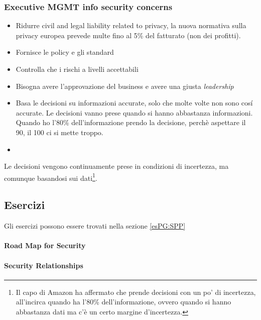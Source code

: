 \subsubsection{Executive MGMT info security concerns}

\begin{itemize}
\item Ridurre civil and legal liability related to privacy, la nuova normativa 
sulla privacy europea prevede multe fino al 5\% del fatturato (non dei 
profitti).
\item Fornisce le policy e gli standard
\item Controlla che i rischi a livelli accettabili
\item Bisogna avere l'approvazione del business e avere una giusta 
\textit{leadership}
\item Basa le decisioni su informazioni accurate, solo che molte volte non sono 
cosí accurate. Le decisioni vanno prese quando si hanno abbastanza informazioni. 
Quando ho l'80\% dell'informazione prendo la decisione, perchè aspettare il 90, 
il 100 ci si mette troppo.
\item {}
\end{itemize}


Le decisioni vengono continuamente prese in condizioni di incertezza, ma 
comunque basandosi sui dati\footnote{Il capo di Amazon ha affermato che prende 
decisioni con un po' di incertezza, all'incirca quando ha l'80\% 
dell'informazione, ovvero quando si hanno abbastanza dati ma c'è un certo 
margine d'incertezza.}.


\subsection{Esercizi}


Gli esercizi possono essere trovati nella sezione \ref{esPG:SPP}

\paragraph{Road Map for Security}

\paragraph{Security Relationships}


